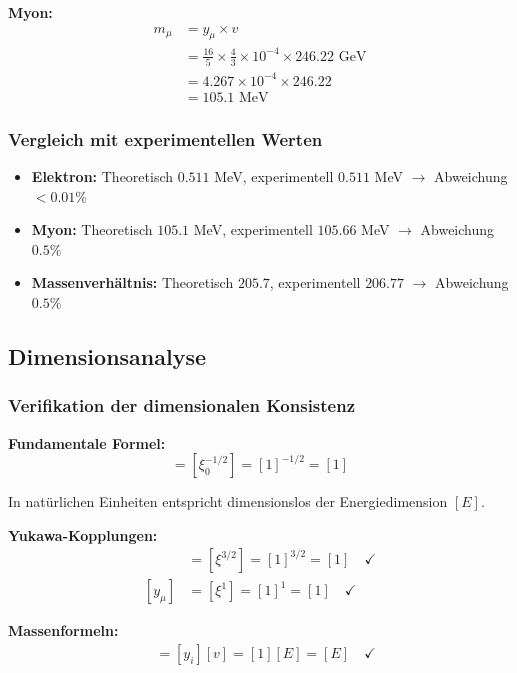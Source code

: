 \textbf{Myon:}
\begin{align}
	m_\mu &= y_\mu \times v\\
	&= \frac{16}{5} \times \frac{4}{3} \times 10^{-4} \times 246.22 \text{ GeV}\\
	&= 4.267 \times 10^{-4} \times 246.22\\
	&= 105.1 \text{ MeV}
\end{align}

\subsubsection{Vergleich mit experimentellen Werten}

\begin{itemize}
	\item \textbf{Elektron:} Theoretisch $0.511$ MeV, experimentell $0.511$ MeV $\rightarrow$ Abweichung $< 0.01\%$
	\item \textbf{Myon:} Theoretisch $105.1$ MeV, experimentell $105.66$ MeV $\rightarrow$ Abweichung $0.5\%$
	\item \textbf{Massenverhältnis:} Theoretisch $205.7$, experimentell $206.77$ $\rightarrow$ Abweichung $0.5\%$
\end{itemize}

\subsection{Dimensionsanalyse}

\subsubsection{Verifikation der dimensionalen Konsistenz}

\textbf{Fundamentale Formel:}
\begin{equation}
	[v] = [\xi_0^{-1/2}] = [1]^{-1/2} = [1]
\end{equation}

In natürlichen Einheiten entspricht dimensionslos der Energiedimension $[E]$.

\textbf{Yukawa-Kopplungen:}
\begin{align}
	[y_e] &= [\xi^{3/2}] = [1]^{3/2} = [1] \quad \checkmark\\
	[y_\mu] &= [\xi^1] = [1]^1 = [1] \quad \checkmark
\end{align}

\textbf{Massenformeln:}
\begin{align}
	[m_i] &= [y_i][v] = [1][E] = [E] \quad \checkmark
\end{align}

